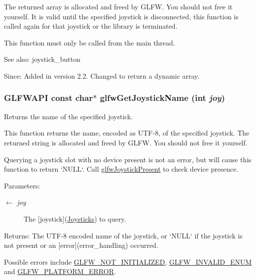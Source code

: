 The returned array is allocated and freed by GLFW. You should not free it yourself. It is valid until the specified joystick is disconnected, this function is called again for that joystick or the library is terminated.

This function must only be called from the main thread.

\begin{Desc}
\item[See also:]joystick\_\-button\end{Desc}
\begin{Desc}
\item[Since:]Added in version 2.2.  Changed to return a dynamic array. \end{Desc}
\hypertarget{group__input_gc50a4fd9b01886cf9fa2c45f19191fb8}{
\subsubsection[glfwGetJoystickName]{\setlength{\rightskip}{0pt plus 5cm}GLFWAPI const char$\ast$ glfwGetJoystickName (int {\em joy})}}
\label{group__input_gc50a4fd9b01886cf9fa2c45f19191fb8}


Returns the name of the specified joystick. 

This function returns the name, encoded as UTF-8, of the specified joystick. The returned string is allocated and freed by GLFW. You should not free it yourself.

Querying a joystick slot with no device present is not an error, but will cause this function to return `NULL`. Call \hyperlink{group__input_g7f81f22f355f4b7d315caf73cdfd9906}{glfwJoystickPresent} to check device presence.

\begin{Desc}
\item[Parameters:]
\begin{description}
\item[\mbox{$\leftarrow$} {\em joy}]The \mbox{[}joystick\mbox{]}(\hyperlink{group__joysticks}{Joysticks}) to query. \end{description}
\end{Desc}
\begin{Desc}
\item[Returns:]The UTF-8 encoded name of the joystick, or `NULL` if the joystick is not present or an \mbox{[}error\mbox{]}(error\_\-handling) occurred.\end{Desc}
Possible errors include \hyperlink{group__errors_g2374ee02c177f12e1fa76ff3ed15e14a}{GLFW\_\-NOT\_\-INITIALIZED}, \hyperlink{group__errors_g76f6bb9c4eea73db675f096b404593ce}{GLFW\_\-INVALID\_\-ENUM} and \hyperlink{group__errors_gd44162d78100ea5e87cdd38426b8c7a1}{GLFW\_\-PLATFORM\_\-ERROR}.

